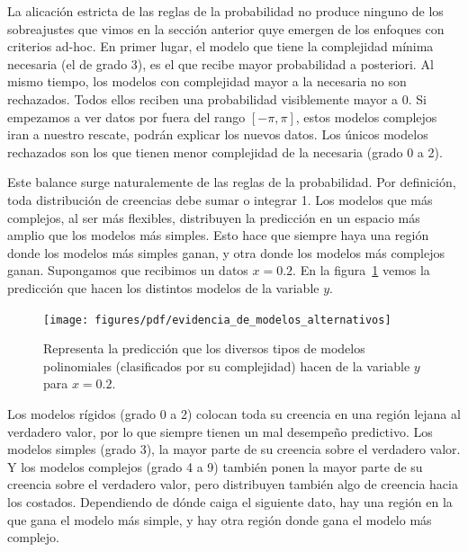 \documentclass[a4paper,11pt]{book}
\theoremstyle{definition}
\begin{document}

La alicación estricta de las reglas de la probabilidad no produce ninguno de los sobreajustes que vimos en la sección anterior quye emergen de los enfoques con criterios ad-hoc.
%
En primer lugar, el modelo que tiene la complejidad mínima necesaria (el de grado 3), es el que recibe mayor probabilidad a posteriori.
%
Al mismo tiempo, los modelos con complejidad mayor a la necesaria no son rechazados.
%
Todos ellos reciben una probabilidad visiblemente mayor a 0.
%
Si empezamos a ver datos por fuera del rango $[-\pi, \pi]$, estos modelos complejos iran a nuestro rescate, podrán explicar los nuevos datos.
%
Los únicos modelos rechazados son los que tienen menor complejidad de la necesaria (grado 0 a 2).


Este balance surge naturalemente de las reglas de la probabilidad.
%
Por definición, toda distribución de creencias debe sumar o integrar 1.
%
Los modelos que más complejos, al ser más flexibles, distribuyen la predicción en un espacio más amplio que los modelos más simples.
%
Esto hace que siempre haya una región donde los modelos más simples ganan, y otra donde los modelos más complejos ganan.
%
Supongamos que recibimos un datos $x = 0.2$.
%
En la figura~\ref{fig:balance_natural} vemos la predicción que hacen los distintos modelos de la variable $y$.
%
\begin{figure}[ht!] \centering
 \texttt{[image: figures/pdf/evidencia\_de\_modelos\_alternativos]}
  \caption{Representa la predicción que los diversos tipos de modelos polinomiales (clasificados por su complejidad) hacen de la variable $y$ para $x=0.2$.}
  \label{fig:balance_natural}
\end{figure}


Los modelos rígidos (grado 0 a 2) colocan toda su creencia en una región lejana al verdadero valor, por lo que siempre tienen un mal desempeño predictivo.
%
Los modelos simples (grado 3), la mayor parte de su creencia sobre el verdadero valor.
%
Y los modelos complejos (grado 4 a 9) también ponen la mayor parte de su creencia sobre el verdadero valor, pero distribuyen también algo de creencia hacia los costados.
%
Dependiendo de dónde caiga el siguiente dato, hay una región en la que gana el modelo más simple, y hay otra región donde gana el modelo más complejo.

\end{document}
